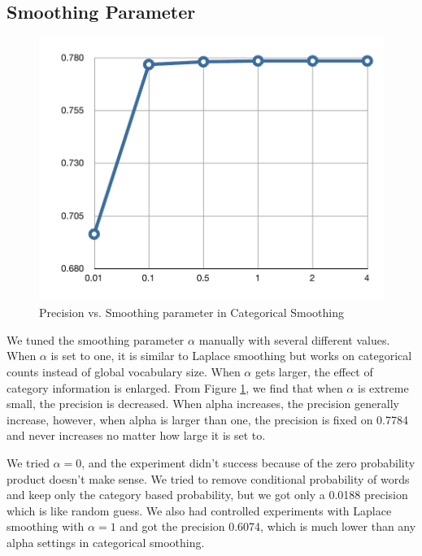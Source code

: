\subsection{Smoothing Parameter}

\begin{figure}[ht]
\vskip 0.2in
\begin{center}
\centerline{\includegraphics[width=\columnwidth]{pvsalpha}}
\caption{Precision vs. Smoothing parameter in Categorical Smoothing}
\label{fig-p-vs-alpha}
\end{center}
\vskip -0.2in
\end{figure}

We tuned the smoothing parameter $\alpha$ manually with several different values. When $\alpha$ is set to one, it is similar to Laplace smoothing but works on categorical counts instead of global vocabulary size. When $\alpha$ gets larger, the effect of category information is enlarged. From Figure \ref{fig-p-vs-alpha}, we find that when $\alpha$ is extreme small, the precision is decreased. When alpha increases, the precision generally increase, however, when alpha is larger than one, the precision is fixed on 0.7784 and never increases no matter how large it is set to.

We tried $\alpha=0$, and the experiment didn't success because of the zero probability product doesn't make sense. We tried to remove conditional probability of words and keep only the category based probability, but we got only a 0.0188 precision which is like random guess. We also had controlled experiments with Laplace smoothing with $\alpha=1$ and got the precision 0.6074, which is much lower than any alpha settings in categorical smoothing. 



